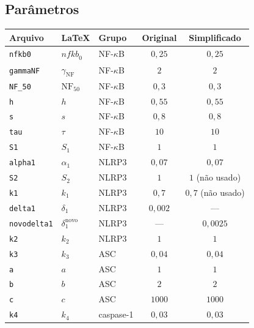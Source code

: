\documentclass[11pt]{article}
\begin{document}
\subsection{Parâmetros}

\begin{longtable}{lllcc}
\toprule
Arquivo & \LaTeX & Grupo & Original & Simplificado \\
\midrule
\endhead
\texttt{nfkb0}      & $\mathit{nfkb}_0$          & NF-$\kappa$B & $0{,}25$ & $0{,}25$ \\
\texttt{gammaNF}    & $\gamma_{\mathrm{NF}}$     & NF-$\kappa$B & $2$      & $2$ \\
\texttt{NF\_50}     & $\mathrm{NF}_{50}$         & NF-$\kappa$B & $0{,}3$  & $0{,}3$ \\
\texttt{h}          & $h$                        & NF-$\kappa$B & $0{,}55$ & $0{,}55$ \\
\texttt{s}          & $s$                        & NF-$\kappa$B & $0{,}8$  & $0{,}8$ \\
\texttt{tau}        & $\tau$                     & NF-$\kappa$B & $10$     & $10$ \\
\texttt{S1}         & $S_1$                      & NF-$\kappa$B & $1$      & $1$ \\
\texttt{alpha1}     & $\alpha_1$                 & NLRP3 & $0{,}07$  & $0{,}07$ \\
\texttt{S2}         & $S_2$                      & NLRP3 & $1$       & $1$ (não usado) \\
\texttt{k1}         & $k_1$                      & NLRP3 & $0{,}7$   & $0{,}7$ (não usado) \\
\texttt{delta1}     & $\delta_1$                 & NLRP3 & $0{,}002$ & --- \\
\texttt{novodelta1} & $\delta_1^{\mathrm{novo}}$ & NLRP3 & ---       & $0{,}0025$ \\
\texttt{k2}         & $k_2$                      & NLRP3 & $1$       & $1$ \\
\texttt{k3}         & $k_3$                      & ASC   & $0{,}04$  & $0{,}04$ \\
\texttt{a}          & $a$                        & ASC   & $1$       & $1$ \\
\texttt{b}          & $b$                        & ASC   & $2$       & $2$ \\
\texttt{c}          & $c$                        & ASC   & $1000$    & $1000$ \\
\texttt{k4}         & $k_4$                      & caspase-1 & $0{,}03$ & $0{,}03$ \\

\end{longtable}
\end{document}

